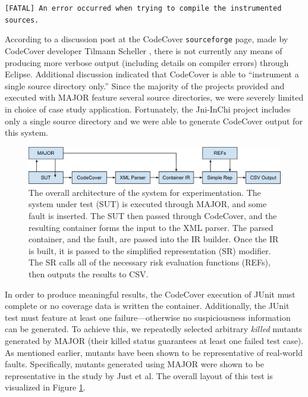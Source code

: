 \vspace{5mm}
\texttt{[FATAL] An error occurred when trying to compile the instrumented sources.}
\vspace{2mm}

According to a discussion post at the CodeCover \texttt{sourceforge}
page, made by CodeCover developer Tilmann Scheller \cite{discpost}, there is not currently any 
means of producing more verbose output (including details on compiler errors) through Eclipse.  
Additional discussion indicated that CodeCover is able to ``instrument
a single source directory only.''  Since the majority of the projects provided and executed with MAJOR
feature several source directories, we were severely limited in choice of case study application.  
Fortunately, the Jni-InChi project includes only a single source directory and we were able
to generate CodeCover output for this system.

\begin{figure}
\centering
\includegraphics[width=0.9\linewidth]{img/Architecture.pdf}
\caption{The overall architecture of the system for experimentation.  The system under test (SUT) is executed through MAJOR, and some fault is inserted.  The SUT then passed through CodeCover, and the resulting container forms the input to the XML parser.  The parsed container, and the fault, are passed into the IR builder.  Once the IR is built, it is passed to the simplified representation (SR) modifier.  The SR calls all of the necessary risk evaluation functions (REFs), then outputs the results to CSV.}
\label{fig:arch}
\end{figure}

In order to produce meaningful results, the CodeCover execution of JUnit must complete or no coverage
data is written the container.  Additionally, the JUnit test must
feature at least one failure---otherwise no
suspiciousness information can be generated.  To achieve this, we repeatedly selected
arbitrary \textit{killed} mutants generated by MAJOR (their killed status guarantees at least one failed
test case).  As mentioned earlier, mutants have been shown to be representative of real-world faults.  
Specifically, mutants generated using MAJOR were shown to be representative in the study by Just et al.
\cite{mutants}  The overall layout of this test is visualized in Figure \ref{fig:arch}.

